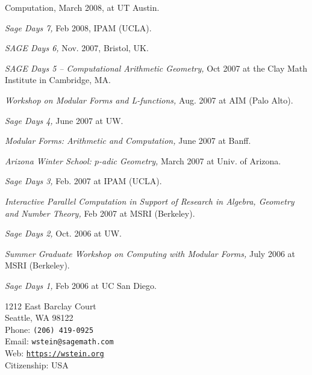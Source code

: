 \documentclass[10pt]{article}
\makeatletter
\newcommand{\phone}{{\tt (206) 419-0925}}
\newcommand{\email}{{\tt wstein@sagemath.com}}
\newcommand{\www}{{\tt \url{https://wstein.org}}}
\newcommand{\address}{1212 East Barclay Court\\
Seattle, WA  98122}
\newcounter{totalnumworkshops}
\newenvironment{workshops}
   {
   \begin{revnumerate}[\value{totalnumworkshops}]
   {}
         {
            \setlength{\itemsep}{.5ex}
            \setlength{\parsep}{0ex}
            \setlength{\leftmargin}{0em}
            \setlength{\parskip}{0ex}
            \setlength{\topsep}{0ex}
         }
   }
   {
\end{revnumerate}
   }
\newcommand{\marginlabel}[1]{
\begin{minipage}[b]{0.8\labelwidth}{\large \textsf{\textbf{#1}}}\end{minipage}}
\newcommand{\entrylabel}[1]{\mbox{\marginlabel{#1}}\hfill}
\newcommand{\MainListlabel}[1]
   {
      \parbox[t]{\labelwidth}{\hspace{.8em}\marginlabel{#1}}
   }
\newenvironment{MainList}[1]
   {
      \renewcommand{\entrylabel}{\MainListlabel}
      \begin{list}{}
      {
         \renewcommand{\makelabel}{\entrylabel}
         \setlength   {\itemindent}{-.65em}
         \setlength   {\labelwidth}{#1}
         \setlength   {\leftmargin}{\labelwidth}
         \setlength   {\itemsep}{3ex}
      }
   }
   {
      \end{list}
   }
\makeatother
\begin{document}
\begin{MainList}{88pt}
\begin{workshops}
{    Computation}, March 2008, at UT Austin.
\item {\em Sage Days 7,} Feb 2008, IPAM (UCLA).
\item {\em SAGE Days 6,} Nov. 2007, Bristol, UK.
\item {\em SAGE Days 5 -- Computational Arithmetic Geometry,} Oct 2007 at the Clay Math Institute
in Cambridge, MA.
\item {\em Workshop on Modular Forms and L-functions,} Aug. 2007 at AIM (Palo Alto).
\item {\em Sage Days 4,} June 2007 at UW.
\item {\em Modular Forms: Arithmetic and Computation,} June 2007 at Banff.
\item {\em Arizona Winter School: $p$-adic Geometry,} March 2007 at Univ. of Arizona.
\item {\em Sage Days 3,} Feb. 2007 at IPAM (UCLA).
\item {\em Interactive Parallel Computation in Support of Research in Algebra, Geometry and Number Theory,} Feb 2007 at MSRI (Berkeley).
\item {\em Sage Days 2,} Oct. 2006 at UW.
\item {\em Summer Graduate Workshop on Computing with Modular Forms,} July 2006 at MSRI (Berkeley).
\item {\em Sage Days 1,} Feb 2006 at UC San Diego.
\end{workshops}



\item [Personal]
\address{}\\\newline
Phone: \phone\\
Email: \email\\
Web: \www \\
Citizenship: USA\\




\end{MainList}
\end{document}

